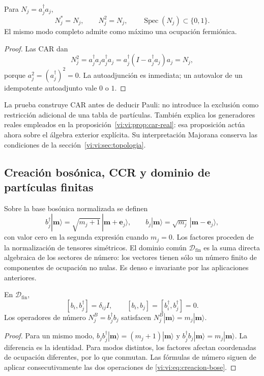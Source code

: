 \begin{corollary}
\label{vi:vi:cor:pauli-ocupacion}
Para \(N_j=a_j^\dagger a_j\),
\[
 N_j^*=N_j,\qquad N_j^2=N_j,\qquad
 \operatorname{Spec}(N_j)\subset\{0,1\}.
\]
El mismo modo completo admite como máximo una ocupación fermiónica.
\end{corollary}
\begin{proof}
Las CAR dan
\[
 N_j^2=a_j^\dagger a_ja_j^\dagger a_j
 =a_j^\dagger(I-a_j^\dagger a_j)a_j=N_j,
\]
porque \(a_j^2=(a_j^\dagger)^2=0\). La autoadjunción es inmediata;
un autovalor de un idempotente autoadjunto vale \(0\) o \(1\).
\end{proof}

La prueba construye CAR antes de deducir Pauli: no introduce la
exclusión como restricción adicional de una tabla de partículas.
También explica los generadores reales empleados en la
proposición~\ref{vi:vi:prop:car-real}: esa proposición actúa ahora
sobre el álgebra exterior explícita. Su interpretación Majorana
conserva las condiciones de la sección~\ref{vi:vi:sec:topologia}.

\subsection{Creación bosónica, CCR y dominio de partículas finitas}
\label{vi:vi:subsec:ccr-construccion}

Sobre la base bosónica normalizada se definen
\begin{equation}
 b_j^\dagger|\boldsymbol m\rangle=
 \sqrt{m_j+1}\,|\boldsymbol m+\boldsymbol e_j\rangle,
 \qquad
 b_j|\boldsymbol m\rangle=
 \sqrt{m_j}\,|\boldsymbol m-\boldsymbol e_j\rangle,
 \label{vi:vi:eq:creacion-bose}
\end{equation}
con valor cero en la segunda expresión cuando \(m_j=0\).
Los factores proceden de la normalización de tensores simétricos.
El dominio común \(\mathcal D_{\mathrm{fin}}\) es la suma directa
algebraica de los sectores de número: los vectores tienen sólo un
número finito de componentes de ocupación no nulas. Es denso e
invariante por las aplicaciones anteriores.

\begin{theorem}
\label{vi:vi:thm:ccr-construidas}
En \(\mathcal D_{\mathrm{fin}}\),
\[
 [b_i,b_j^\dagger]=\delta_{ij}I,\qquad
 [b_i,b_j]=[b_i^\dagger,b_j^\dagger]=0.
\]
Los operadores de número \(N_j^B=b_j^\dagger b_j\) satisfacen
\(N_j^B|\boldsymbol m\rangle=m_j|\boldsymbol m\rangle\).
\end{theorem}
\begin{proof}
Para un mismo modo,
\(b_jb_j^\dagger|\boldsymbol m\rangle=(m_j+1)|\boldsymbol m\rangle\)
y \(b_j^\dagger b_j|\boldsymbol m\rangle=m_j|\boldsymbol m\rangle\).
La diferencia es la identidad. Para modos distintos, los factores
afectan coordenadas de ocupación diferentes, por lo que conmutan.
Las fórmulas de número siguen de aplicar consecutivamente las dos
operaciones de \eqref{vi:vi:eq:creacion-bose}.
\end{proof}


